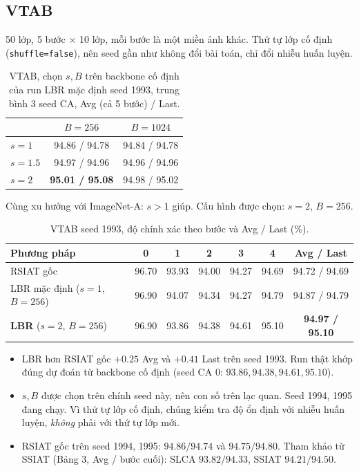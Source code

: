 \documentclass[11pt]{article}
\begin{document}
\subsection{VTAB}
50 lớp, 5 bước $\times$ 10 lớp, mỗi bước là một miền ảnh khác. Thứ tự lớp cố định (\texttt{shuffle=false}), nên seed gần
như không đổi bài toán, chỉ đổi nhiễu huấn luyện.

\begin{table}[H]
\centering\small
\caption{VTAB, chọn $s,B$ trên backbone cố định của run LBR mặc định seed 1993, trung bình 3 seed CA, Avg (cả 5 bước) /
Last.}
\label{tab:vtab_grid}
\begin{tabular}{lcc}
\toprule
& $B=256$ & $B=1024$\\
\midrule
$s=1$ & 94.86 / 94.78 & 94.84 / 94.78\\
$s=1.5$ & 94.97 / 94.96 & 94.96 / 94.96\\
$s=2$ & \textbf{95.01 / 95.08} & 94.98 / 95.02\\
\bottomrule
\end{tabular}
\end{table}
Cùng xu hướng với ImageNet-A: $s>1$ giúp. Cấu hình được chọn: $s=2$, $B=256$.

\begin{table}[H]
\centering\small
\caption{VTAB seed 1993, độ chính xác theo bước và Avg / Last (\%).}
\label{tab:vtab}
\begin{tabular}{lccccc|c}
\toprule
Phương pháp & 0 & 1 & 2 & 3 & 4 & Avg / Last\\
\midrule
RSIAT gốc & 96.70 & 93.93 & 94.00 & 94.27 & 94.69 & 94.72 / 94.69\\
LBR mặc định ($s{=}1$, $B{=}256$) & 96.90 & 94.07 & 94.34 & 94.27 & 94.79 & 94.87 / 94.79\\
\textbf{LBR} ($s{=}2$, $B{=}256$) & 96.90 & 93.86 & 94.38 & 94.61 & 95.10 & \textbf{94.97 / 95.10}\\
\bottomrule
\end{tabular}
\end{table}
\begin{itemize}
\item LBR hơn RSIAT gốc $+0.25$ Avg và $+0.41$ Last trên seed 1993. Run thật khớp đúng dự đoán từ backbone cố định
      (seed CA 0: $93.86, 94.38, 94.61, 95.10$).
\item $s,B$ được chọn trên chính seed này, nên con số trên lạc quan. Seed 1994, 1995 đang chạy. Vì thứ tự lớp cố định,
      chúng kiểm tra độ ổn định với nhiễu huấn luyện, \emph{không} phải với thứ tự lớp mới.
\item RSIAT gốc trên seed 1994, 1995: $94.86/94.74$ và $94.75/94.80$. Tham khảo từ SSIAT \cite{ssiat} (Bảng 3, Avg / bước
      cuối): SLCA $93.82/94.33$, SSIAT $94.21/94.50$.
\end{itemize}
\end{document}
